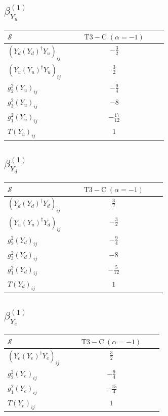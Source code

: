 \documentclass[9pt]{article}
\begin{document}
\subsection*{$ \beta_{Y_u}^{(1)} $}
\begin{longtable}{@{}p{0.38\linewidth}c@{}}
\toprule
$\mathcal{S}$ & $ \mathrm{T3-C}\;(\alpha=-1) $ \\
\midrule
$ (Y_d (Y_d)^{\dagger} Y_u)_{ij} $ & $ - \frac{3}{2} $ \\
$ (Y_u (Y_u)^{\dagger} Y_u)_{ij} $ & $ \frac{3}{2} $ \\
$ g_2^2 (Y_u)_{ij} $ & $ - \frac{9}{4} $ \\
$ g_3^2 (Y_u)_{ij} $ & $ -8 $ \\
$ g_1^2 (Y_u)_{ij} $ & $ - \frac{17}{12} $ \\
$ T (Y_u)_{ij} $ & $ 1 $ \\
\bottomrule
\end{longtable}
\subsection*{$ \beta_{Y_d}^{(1)} $}
\begin{longtable}{@{}p{0.38\linewidth}c@{}}
\toprule
$\mathcal{S}$ & $ \mathrm{T3-C}\;(\alpha=-1) $ \\
\midrule
$ (Y_d (Y_d)^{\dagger} Y_d)_{ij} $ & $ \frac{3}{2} $ \\
$ (Y_u (Y_u)^{\dagger} Y_d)_{ij} $ & $ - \frac{3}{2} $ \\
$ g_2^2 (Y_d)_{ij} $ & $ - \frac{9}{4} $ \\
$ g_3^2 (Y_d)_{ij} $ & $ -8 $ \\
$ g_1^2 (Y_d)_{ij} $ & $ - \frac{5}{12} $ \\
$ T (Y_d)_{ij} $ & $ 1 $ \\
\bottomrule
\end{longtable}
\subsection*{$ \beta_{Y_e}^{(1)} $}
\begin{longtable}{@{}p{0.38\linewidth}c@{}}
\toprule
$\mathcal{S}$ & $ \mathrm{T3-C}\;(\alpha=-1) $ \\
\midrule
$ (Y_e (Y_e)^{\dagger} Y_e)_{ij} $ & $ \frac{3}{2} $ \\
$ g_2^2 (Y_e)_{ij} $ & $ - \frac{9}{4} $ \\
$ g_1^2 (Y_e)_{ij} $ & $ - \frac{15}{4} $ \\
$ T (Y_e)_{ij} $ & $ 1 $ \\
\bottomrule
\end{longtable}
\end{document}
